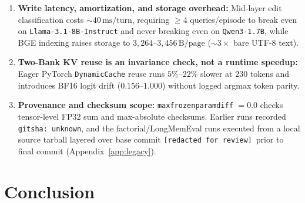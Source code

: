 \documentclass[11pt]{article}
\renewcommand{\_}{\origunderscore\allowbreak}
\begin{document}
\begin{enumerate}
    \item \textbf{Write latency, amortization, and storage overhead:} Mid-layer edit classification costs $\sim 40\,\text{ms/turn}$, requiring $\ge 4$ queries/episode to break even on \texttt{Llama-3.1-8B-Instruct} and never breaking even on \texttt{Qwen3-1.7B}, while BGE indexing raises storage to $3{,}264$--$3{,}456\,\text{B/page}$ ($\sim 3\times$ bare UTF-8 text).
    \item \textbf{Two-Bank KV reuse is an invariance check, not a runtime speedup:} Eager PyTorch \texttt{DynamicCache} reuse runs $5\%$--$22\%$ slower at $230$ tokens and introduces BF16 logit drift ($0.156$--$1.000$) without logged argmax token parity.
    \item \textbf{Provenance and checksum scope:} \texttt{max\_frozen\_param\_diff} $=0.0$ checks tensor-level FP32 sum and max-absolute checksums. Earlier runs recorded \texttt{git\_sha: unknown}, and the factorial/LongMemEval runs executed from a local source tarball layered over base commit \texttt{[redacted for review]}\ prior to final commit (Appendix~\ref{app:legacy}).
\end{enumerate}

\section{Conclusion}
\label{sec:conclusion}
\end{document}
